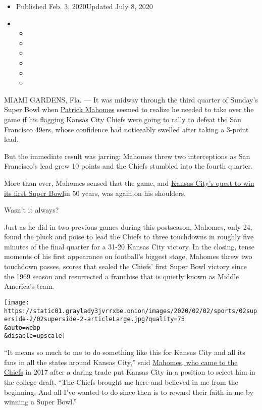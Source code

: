 \begin{itemize}
\item
  Published Feb. 3, 2020Updated July 8, 2020
\item
  \begin{itemize}
  \item
  \item
  \item
  \item
  \item
  \item
  \end{itemize}
\end{itemize}

MIAMI GARDENS, Fla. --- It was midway through the third quarter of
Sunday's Super Bowl when
\href{https://www.nytimes3xbfgragh.onion/2020/07/08/sports/football/patrick-mahomes-contract-guarantee.html}{Patrick
Mahomes} seemed to realize he needed to take over the game if his
flagging Kansas City Chiefs were going to rally to defeat the San
Francisco 49ers, whose confidence had noticeably swelled after taking a
3-point lead.

But the immediate result was jarring: Mahomes threw two interceptions as
San Francisco's lead grew 10 points and the Chiefs stumbled into the
fourth quarter.

More than ever, Mahomes sensed that the game, and
\href{https://www.nytimes3xbfgragh.onion/2020/02/03/sports/football/super-bowl-score.html}{Kansas
City's quest to win its first Super Bowl}in 50 years, was again on his
shoulders.

Wasn't it always?

Just as he did in two previous games during this postseason, Mahomes,
only 24, found the pluck and poise to lead the Chiefs to three
touchdowns in roughly five minutes of the final quarter for a 31-20
Kansas City victory. In the closing, tense moments of his first
appearance on football's biggest stage, Mahomes threw two touchdown
passes, scores that sealed the Chiefs' first Super Bowl victory since
the 1969 season and resurrected a franchise that is quietly known as
Middle America's team.

\texttt{[image: https://static01.graylady3jvrrxbe.onion/images/2020/02/02/sports/02superside-2/02superside-2-articleLarge.jpg?quality=75\\\&auto=webp\\\&disable=upscale]}

``It means so much to me to do something like this for Kansas City and
all its fans in all the states around Kansas City,'' said
\href{https://www.nytimes3xbfgragh.onion/2020/01/30/sports/football/Chiefs-patrick-mahomes.html}{Mahomes,
who came to the Chiefs} in 2017 after a daring trade put Kansas City in
a position to select him in the college draft. ``The Chiefs brought me
here and believed in me from the beginning. And all I've wanted to do
since then is to reward their faith in me by winning a Super Bowl.''

